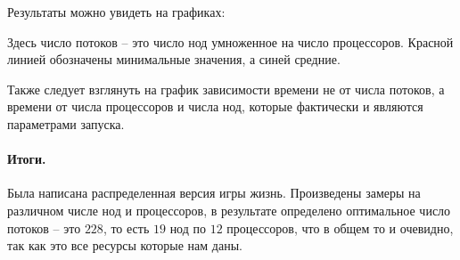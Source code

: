 \documentclass[12pt]{article}
\begin{document}
Результаты можно увидеть на графиках:
\begin{center}
\end{center}
Здесь число потоков -- это число нод умноженное на число процессоров. Красной
линией обозначены минимальные значения, а синей средние.
\begin{center}
\end{center}
Также следует взглянуть на график зависимости времени не от числа потоков,
а времени от числа процессоров и числа нод, которые фактически и являются
параметрами запуска.

\paragraph{Итоги.} Была написана распределенная версия игры жизнь. Произведены
замеры на различном числе нод и процессоров, в результате определено оптимальное
число потоков -- это $ 228 $, то есть $ 19 $ нод по $ 12 $ процессоров, что в общем
то и очевидно, так как это все ресурсы которые нам даны.
\end{document}
